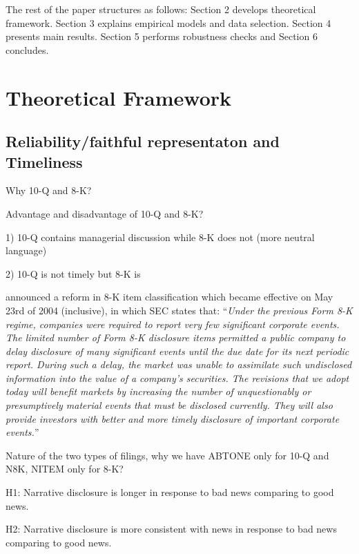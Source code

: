 \documentclass[a4paper]{article}
\begin{document}
\begin{spacing}{2}



The rest of the paper structures as follows: Section 2 develops theoretical framework. Section 3 explains empirical models and data selection. Section 4 presents main results. Section 5 performs robustness checks and Section 6 concludes.

\section{Theoretical Framework}
\subsection{Reliability/faithful representaton and Timeliness}

Why 10-Q and 8-K?

Advantage and disadvantage of 10-Q and 8-K?

1) 10-Q contains managerial discussion while 8-K does not (more neutral language)

2) 10-Q is not timely but 8-K is 

\cite{secFinalRuleAdditional2004} announced a reform in 8-K item classification which became effective on May 23rd of 2004 (inclusive), in which SEC states that:
“\textit{Under the previous Form 8-K regime, companies were required to report very few significant corporate events. The limited number of Form 8-K disclosure items permitted a public company to delay disclosure of many significant events until the due date for its next periodic report. During such a delay, the market was unable to assimilate such undisclosed information into the value of a company's securities. The revisions that we adopt today will benefit markets by increasing the number of unquestionably or presumptively material events that must be disclosed currently. They will also provide investors with better and more timely disclosure of important corporate events.}”

Nature of the two types of filings, why we have ABTONE only for 10-Q and N8K, NITEM only for 8-K?

\begin{center}
	H1: Narrative disclosure is longer in response to bad news comparing to good news.
\end{center}

\begin{center}
	H2: Narrative disclosure is more consistent with news in response to bad news comparing to good news.
\end{center}


\end{spacing}
\end{document}
